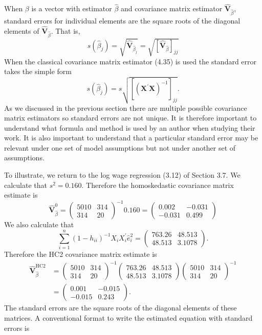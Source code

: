 \documentclass[10pt]{article}
\begin{document}
When $\beta$ is a vector with estimator $\widehat{\beta}$ and covariance matrix estimator $\widehat{\boldsymbol{V}}_{\widehat{\beta}}$, standard errors for individual elements are the square roots of the diagonal elements of $\widehat{\boldsymbol{V}}_{\widehat{\beta}}$. That is,
$$
s\left(\widehat{\beta}_{j}\right)=\sqrt{\widehat{\boldsymbol{V}}_{\widehat{\beta}_{j}}}=\sqrt{\left[\widehat{\boldsymbol{V}}_{\widehat{\beta}}\right]_{j j}}
$$
When the classical covariance matrix estimator (4.35) is used the standard error takes the simple form
$$
s\left(\widehat{\beta}_{j}\right)=s \sqrt{\left[\left(\boldsymbol{X}^{\prime} \boldsymbol{X}\right)^{-1}\right]_{j j}} .
$$
As we discussed in the previous section there are multiple possible covariance matrix estimators so standard errors are not unique. It is therefore important to understand what formula and method is used by an author when studying their work. It is also important to understand that a particular standard error may be relevant under one set of model assumptions but not under another set of assumptions.

To illustrate, we return to the log wage regression (3.12) of Section 3.7. We calculate that $s^{2}=0.160$. Therefore the homoskedastic covariance matrix estimate is
$$
\widehat{\boldsymbol{V}}_{\widehat{\beta}}^{0}=\left(\begin{array}{cc}
5010 & 314 \\
314 & 20
\end{array}\right)^{-1} 0.160=\left(\begin{array}{cc}
0.002 & -0.031 \\
-0.031 & 0.499
\end{array}\right)
$$
We also calculate that
$$
\sum_{i=1}^{n}\left(1-h_{i i}\right)^{-1} X_{i} X_{i}^{\prime} \widehat{e}_{i}^{2}=\left(\begin{array}{cc}
763.26 & 48.513 \\
48.513 & 3.1078
\end{array}\right) .
$$
Therefore the HC2 covariance matrix estimate is
$$
\begin{aligned}
\widehat{\boldsymbol{V}}_{\widehat{\beta}}^{\mathrm{HC} 2} &=\left(\begin{array}{cc}
5010 & 314 \\
314 & 20
\end{array}\right)^{-1}\left(\begin{array}{cc}
763.26 & 48.513 \\
48.513 & 3.1078
\end{array}\right)\left(\begin{array}{cc}
5010 & 314 \\
314 & 20
\end{array}\right)^{-1} \\
&=\left(\begin{array}{cc}
0.001 & -0.015 \\
-0.015 & 0.243
\end{array}\right) .
\end{aligned}
$$
The standard errors are the square roots of the diagonal elements of these matrices. A conventional format to write the estimated equation with standard errors is
\end{document}
